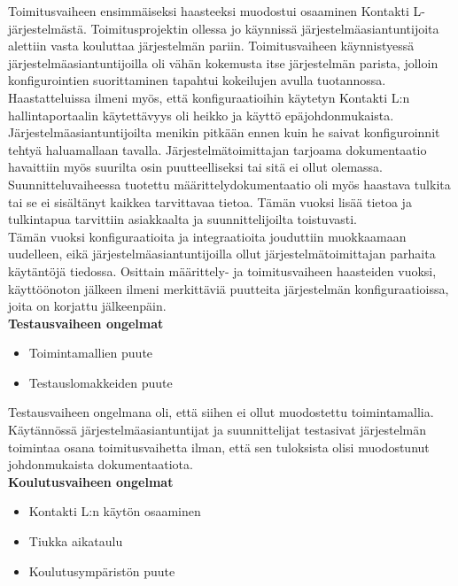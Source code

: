 \documentclass[finnish,12pt,a4paper,pdftex]{article}
\begin{document}
\noindent Toimitusvaiheen ensimmäiseksi haasteeksi muodostui osaaminen Kontakti L-järjestelmästä. Toimitusprojektin ollessa jo käynnissä  järjestelmäasiantuntijoita alettiin vasta kouluttaa järjestelmän pariin. Toimitusvaiheen käynnistyessä järjestelmäasiantuntijoilla oli vähän kokemusta itse järjestelmän parista, jolloin konfigurointien suorittaminen tapahtui kokeilujen avulla tuotannossa. \\

\noindent Haastatteluissa ilmeni myös, että konfiguraatioihin käytetyn Kontakti L:n hallintaportaalin käytettävyys oli heikko ja käyttö epäjohdonmukaista. Järjestelmäasiantuntijoilta menikin pitkään ennen kuin he saivat konfiguroinnit tehtyä haluamallaan tavalla. Järjestelmätoimittajan tarjoama dokumentaatio havaittiin myös suurilta osin puutteelliseksi tai sitä ei ollut olemassa. \\

\noindent Suunnitteluvaiheessa tuotettu määrittelydokumentaatio oli myös haastava tulkita tai se ei sisältänyt kaikkea tarvittavaa tietoa. Tämän vuoksi lisää tietoa ja tulkintapua tarvittiin asiakkaalta ja suunnittelijoilta toistuvasti.\\

\noindent Tämän vuoksi konfiguraatioita ja integraatioita jouduttiin muokkaamaan uudelleen, eikä järjestelmäasiantuntijoilla ollut järjestelmätoimittajan parhaita käytäntöjä tiedossa. Osittain määrittely- ja toimitusvaiheen haasteiden vuoksi, käyttöönoton jälkeen ilmeni merkittäviä puutteita järjestelmän konfiguraatioissa, joita on korjattu jälkeenpäin.\\

\textbf{Testausvaiheen ongelmat}\\

\begin{itemize}
    \item Toimintamallien puute
    \item Testauslomakkeiden puute
\end{itemize}

\noindent Testausvaiheen ongelmana oli, että siihen ei ollut muodostettu toimintamallia. Käytännössä järjestelmäasiantuntijat ja suunnittelijat testasivat järjestelmän toimintaa osana toimitusvaihetta ilman, että sen tuloksista olisi muodostunut johdonmukaista dokumentaatiota. \\

\textbf{Koulutusvaiheen ongelmat}\\

\begin{itemize}
    \item Kontakti L:n käytön osaaminen
    \item Tiukka aikataulu
    \item Koulutusympäristön puute
\end{itemize}
\end{document}
